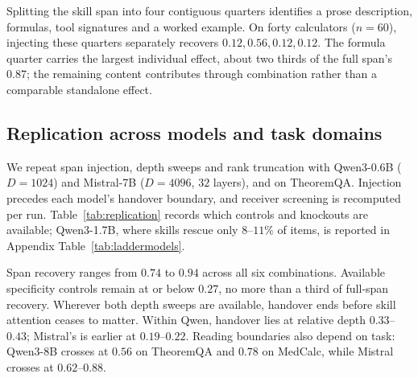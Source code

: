 \documentclass{article}
\begin{document}
Splitting the skill span into four contiguous quarters identifies a prose
description, formulas, tool signatures and a worked example. On forty
calculators ($n=60$), injecting these quarters separately recovers
$0.12,0.56,0.12,0.12$. The formula quarter carries the largest individual effect,
about two thirds of the full span's $0.87$; the remaining content contributes
through combination rather than a comparable standalone effect.

\subsection{Replication across models and task domains}
\label{sec:ladder}

We repeat span injection, depth sweeps and rank truncation with Qwen3-0.6B
($D=1024$) and Mistral-7B ($D=4096$, $32$ layers), and on TheoremQA. Injection
precedes each model's handover boundary, and receiver screening is recomputed
per run. Table~\ref{tab:replication} records which controls and knockouts are
available; Qwen3-1.7B, where skills rescue only $8$--$11\%$ of items, is reported
in Appendix Table~\ref{tab:laddermodels}.

\begin{table}[t]
\caption{Replication after the instrument fix. Injection layers are $8$ for
Qwen3-8B, $6$ for Qwen3-0.6B and $4$ for Mistral-7B. Recovery intervals bootstrap
skill groups. Max control is the largest available half-dose, other-skill,
permutation or noise result. Handover brackets the relative depth where
$\rho$ crosses below $0.5$; reading is the first knockout depth retaining at
least half of rescued items. $k^{*}$ is the grid-defined rank knee.
``--'' denotes a measurement not run after the fix.}
\label{tab:replication}
\centering
\footnotesize
\setlength{\tabcolsep}{4pt}

\end{table}

Span recovery ranges from $0.74$ to $0.94$ across all six combinations.
Available specificity controls remain at or below $0.27$, no more than a third
of full-span recovery. Wherever both depth sweeps are available, handover ends
before skill attention ceases to matter. Within Qwen, handover lies at relative
depth $0.33$--$0.43$; Mistral's is earlier at $0.19$--$0.22$. Reading boundaries
also depend on task: Qwen3-8B crosses at $0.56$ on TheoremQA and $0.78$ on
MedCalc, while Mistral crosses at $0.62$--$0.88$.
\end{document}

